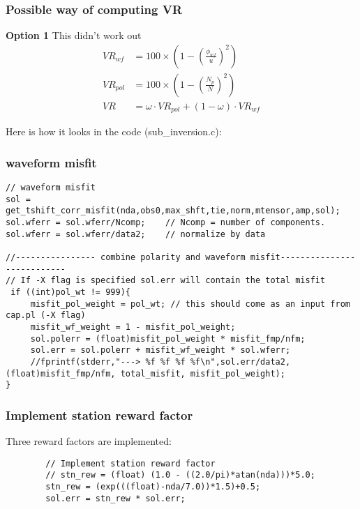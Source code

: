 \documentclass[11pt,titlepage,fleqn]{article}
\begin{document}
\subsubsection*{Possible way of computing VR}
{\bf Option 1} This didn't work out
\begin{align*}
VR_{wf} &= 100 \times \left( 1 - \left (\frac{\phi_{wf}}{u} \right)^2 \right) \\
VR_{pol} &= 100 \times \left( 1 - \left ( \frac{N_p}{N} \right) ^2 \right ) \\
VR &=  \omega \cdot VR_{pol} + (1 - \omega) \cdot VR_{wf}
\end{align*}


Here is how it looks in the code (sub\_inversion.c):
\subsubsection*{waveform misfit}
\begin{verbatim}
// waveform misfit
sol = get_tshift_corr_misfit(nda,obs0,max_shft,tie,norm,mtensor,amp,sol);
sol.wferr = sol.wferr/Ncomp;    // Ncomp = number of components.
sol.wferr = sol.wferr/data2;    // normalize by data

//---------------- combine polarity and waveform misfit---------------------------
// If -X flag is specified sol.err will contain the total misfit
 if ((int)pol_wt != 999){
     misfit_pol_weight = pol_wt; // this should come as an input from cap.pl (-X flag)
     misfit_wf_weight = 1 - misfit_pol_weight;
     sol.polerr = (float)misfit_pol_weight * misfit_fmp/nfm;
     sol.err = sol.polerr + misfit_wf_weight * sol.wferr;
     //fprintf(stderr,"---> %f %f %f %f\n",sol.err/data2, (float)misfit_fmp/nfm, total_misfit, misfit_pol_weight);
}
\end{verbatim}
\subsubsection*{Implement station reward factor}
Three reward factors are implemented:
\begin{verbatim}
	    // Implement station reward factor
	    // stn_rew = (float) (1.0 - ((2.0/pi)*atan(nda)))*5.0;
	    stn_rew = (exp(((float)-nda/7.0))*1.5)+0.5;
	    sol.err = stn_rew * sol.err;
\end{verbatim}
\end{document}
